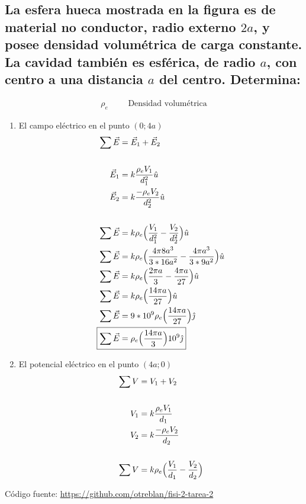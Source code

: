 \documentclass[10pt, twoside]{article}
\begin{document}
\subsection*{La esfera hueca mostrada en la figura es de material no conductor,
radio externo $2a$, y posee densidad volumétrica de carga constante.
La cavidad también es esférica, de radio $a$, con centro a una distancia
$a$ del centro. Determina:}%
\begin{align*}
	\rho_e & && \text{Densidad volumétrica}
\end{align*}
\begin{enumerate}[label=\textbf{\alph*)}]
	\item El campo eléctrico en el punto $(0;4a)$
		\begin{align*}
			\sum\vec{E} &= \vec{E}_1 + \vec{E}_2\\
			\\
			\vec{E}_1 &= k \frac{\rho_eV_1}{d_1^2}\hat{u}\\
			\vec{E}_2 &= k \frac{-\rho_eV_2}{d_2^2}\hat{u}\\
			\\
			\sum\vec{E} &= k\rho_e\Big{(}\frac{V_1}{d_1^2}-\frac{V_2}{d_2^2}\Big{)}\hat{u}\\
			\sum\vec{E} &= k\rho_e\Big{(}\frac{4\pi 8a^3}{3*16a^2}-\frac{4\pi a^3}{3*9a^2}\Big{)}\hat{u}\\
			\sum\vec{E} &= k\rho_e\Big{(}\frac{2\pi a}{3}-\frac{4\pi a}{27}\Big{)}\hat{u}\\
			\sum\vec{E} &= k\rho_e\Big{(}\frac{14\pi a}{27}\Big{)}\hat{u}\\
			\sum\vec{E} &= 9*10^9\rho_e\Big{(}\frac{14\pi a}{27}\Big{)}\hat{\jmath}\\
			\Aboxed
			{
				\sum\vec{E} &= \rho_e\Big{(}\frac{14\pi a}{3}\Big{)}10^9\hat{\jmath}
			}
		\end{align*}
	\item El potencial eléctrico en el punto $(4a;0)$
		\begin{align*}
			\sum V &= V_1+V_2\\
			\\
			V_1 &= k \frac{\rho_eV_1}{d_1}\\
			V_2 &= k \frac{-\rho_eV_2}{d_2}\\
			\\
			\sum V &= k\rho_e \Big{(} \frac{V_1}{d_1}- \frac{V_2}{d_2} \Big{)}
		\end{align*}
\end{enumerate}
\vfill
Código fuente: \url{https://github.com/otreblan/fisi-2-tarea-2}
\end{document}
